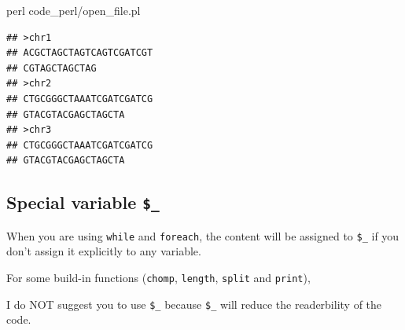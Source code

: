 \documentclass[]{book}
\makeatletter
\newenvironment{Shaded}{\begin{snugshade}}{\end{snugshade}}
\newcommand{\CharTok}[1]{\textcolor[rgb]{0.31,0.60,0.02}{#1}}
\newcommand{\DataTypeTok}[1]{\textcolor[rgb]{0.13,0.29,0.53}{#1}}
\newcommand{\FunctionTok}[1]{\textcolor[rgb]{0.00,0.00,0.00}{#1}}
\newcommand{\KeywordTok}[1]{\textcolor[rgb]{0.13,0.29,0.53}{\textbf{#1}}}
\newcommand{\NormalTok}[1]{#1}
\newcommand{\StringTok}[1]{\textcolor[rgb]{0.31,0.60,0.02}{#1}}
\newenvironment{kframe}{%
\medskip{}
\setlength{\fboxsep}{.8em}
 \def\at@end@of@kframe{}%
 \ifinner\ifhmode%
  \def\at@end@of@kframe{\end{minipage}}%
  \begin{minipage}{\columnwidth}%
 \fi\fi%
 \def\FrameCommand##1{\hskip\@totalleftmargin \hskip-\fboxsep
 \colorbox{shadecolor}{##1}\hskip-\fboxsep
     \hskip-\linewidth \hskip-\@totalleftmargin \hskip\columnwidth}%
 \MakeFramed {\advance\hsize-\width
   \@totalleftmargin\z@ \linewidth\hsize
   \@setminipage}}%
 {\par\unskip\endMakeFramed%
 \at@end@of@kframe}
\renewenvironment{Shaded}{\begin{kframe}}{\end{kframe}}
\makeatother
\begin{document}
\begin{Shaded}
\begin{Highlighting}[]
\FunctionTok{perl}\NormalTok{ code_perl/open_file.pl}
\end{Highlighting}
\end{Shaded}

\begin{verbatim}
## >chr1
## ACGCTAGCTAGTCAGTCGATCGT
## CGTAGCTAGCTAG
## >chr2
## CTGCGGGCTAAATCGATCGATCG
## GTACGTACGAGCTAGCTA
## >chr3
## CTGCGGGCTAAATCGATCGATCG
## GTACGTACGAGCTAGCTA
\end{verbatim}

\hypertarget{special-variable-_}{%
\subsection{\texorpdfstring{Special variable \texttt{\$\_}}{Special variable \$\_}}\label{special-variable-_}}

\begin{Shaded}
\end{Shaded}

When you are using \texttt{while} and \texttt{foreach}, the content will be assigned to \texttt{\$\_} if you don't assign it explicitly to any variable.

For some build-in functions (\texttt{chomp}, \texttt{length}, \texttt{split} and \texttt{print}),

I do NOT suggest you to use \texttt{\$\_} because \texttt{\$\_} will reduce the readerbility of the code.
\end{document}
